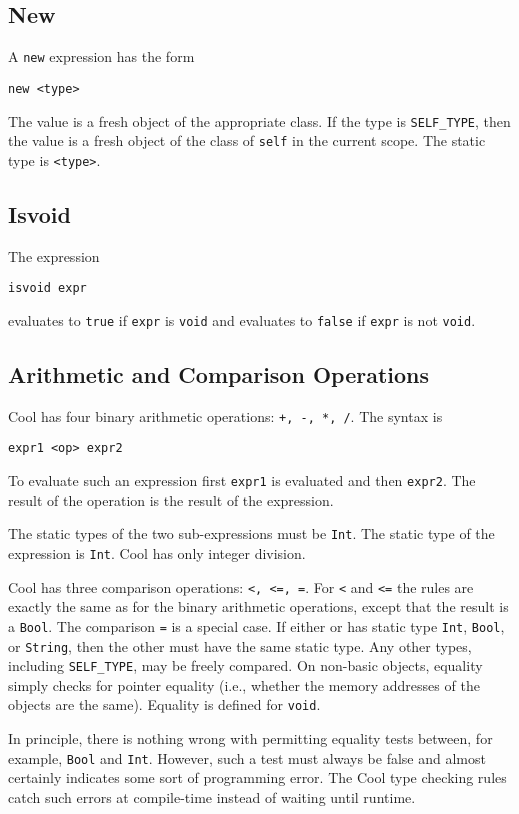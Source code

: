 \documentclass[11pt]{article}
\newcommand{\styp}{{\tt SELF\_TYPE}}
\begin{document}
\subsection{New}
A {\tt new} expression has the form
\begin{verbatim}
new <type> 
\end{verbatim}
The value is a fresh object of the appropriate class.
If the type is \styp, then the value is a fresh object of the
class of {\tt self} in the current scope.
The static type is {\tt <type>}.


\subsection{Isvoid}
\label{sec-isvoid}

The expression
\begin{verbatim}
isvoid expr
\end{verbatim}
evaluates to {\tt true} if {\tt expr} is {\tt void} and evaluates
to {\tt false} if {\tt expr} is not {\tt void}.


\subsection{Arithmetic and Comparison Operations}

Cool has four binary arithmetic operations: {\tt +, -, *, /}.
The syntax is
\begin{verbatim}
expr1 <op> expr2
\end{verbatim}
To evaluate such an expression first {\tt expr1} is evaluated and
then {\tt expr2}.  The result of the operation is the result of the
expression.

The static types of the two sub-expressions must be {\tt Int}.
The static type of the expression is {\tt Int}.
Cool has only integer division.

Cool has three comparison operations: {\tt <, <=, =}.
For {\tt <} and {\tt <=} the rules are exactly the same as
for the binary arithmetic operations, except that the result
is a {\tt Bool}.  The comparison {\tt =} is a special case.
If either {\tt <expr1>} or {\tt <expr2>} has static type {\tt Int},
{\tt Bool}, or {\tt String}, then the other must have the same static type.
Any other types, including \styp, may be freely compared. 
On non-basic objects, equality simply checks for pointer equality (i.e.,
whether the memory addresses of the objects are the same).  Equality
is defined for {\tt void}.

In principle, there is nothing wrong with permitting equality
tests between, for example, {\tt Bool} and {\tt Int}.  However, such a test
must always be false and almost certainly indicates some sort of
programming error.  The Cool type checking rules catch such errors
at compile-time instead of waiting until runtime.
\end{document}
